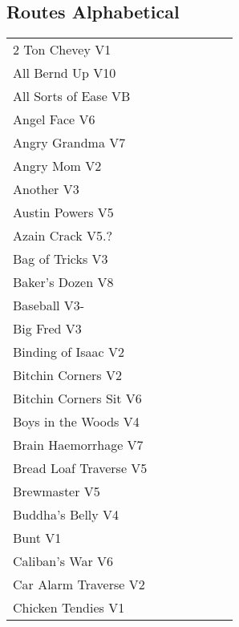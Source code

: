 \twocolumn
{}
\begin{flushleft}
\section{Routes Alphabetical}
\begin{center}
\begin{supertabular}{p{0.65\linewidth}r}
2 Ton Chevey V1 & \pageref{rt:2 Ton Chevey} \\
All Bernd Up V10 & \pageref{rt:All Bernd Up} \\
All Sorts of Ease VB & \pageref{rt:All Sorts of Ease} \\
Angel Face V6 & \pageref{rt:Angel Face} \\
Angry Grandma V7 & \pageref{rt:Angry Grandma} \\
Angry Mom V2 & \pageref{rt:Angry Mom} \\
Another V3 & \pageref{rt:Another} \\
Austin Powers V5 & \pageref{rt:Austin Powers} \\
Azain Crack V5.? & \pageref{rt:Azain Crack} \\
Bag of Tricks V3 & \pageref{vr:Bag of Tricks} \\
Baker's Dozen V8 & \pageref{vr:Baker's Dozen} \\
Baseball V3- & \pageref{rt:Baseball} \\
Big Fred V3 & \pageref{rt:Big Fred} \\
Binding of Isaac V2 & \pageref{rt:Binding of Isaac} \\
Bitchin Corners V2 & \pageref{rt:Bitchin Corners} \\
Bitchin Corners Sit V6 & \pageref{vr:Bitchin Corners Sit} \\
Boys in the Woods V4 & \pageref{rt:Boys in the Woods} \\
Brain Haemorrhage V7 & \pageref{vr:Brain Haemorrhage} \\
Bread Loaf Traverse V5 & \pageref{rt:Bread Loaf Traverse} \\
Brewmaster V5 & \pageref{rt:Brewmaster} \\
Buddha's Belly V4 & \pageref{rt:Buddha's Belly} \\
Bunt V1 & \pageref{rt:Bunt} \\
Caliban's War V6 & \pageref{rt:Caliban's War} \\
Car Alarm Traverse V2 & \pageref{rt:Car Alarm Traverse} \\
Chicken Tendies V1 & \pageref{rt:Chicken Tendies} \\

\end{supertabular}
\end{center}
\end{flushleft}
